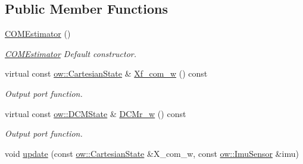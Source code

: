 \subsection*{Public Member Functions}
\begin{DoxyCompactItemize}
\item 
\hyperlink{classow__com_1_1COMEstimator_aee6f0a9c7f06cf62ef41ca7180374e52}{C\+O\+M\+Estimator} ()\hypertarget{classow__com_1_1COMEstimator_aee6f0a9c7f06cf62ef41ca7180374e52}{}\label{classow__com_1_1COMEstimator_aee6f0a9c7f06cf62ef41ca7180374e52}

\begin{DoxyCompactList}\small\item\em \hyperlink{classow__com_1_1COMEstimator}{C\+O\+M\+Estimator} Default constructor. \end{DoxyCompactList}\item 
virtual const \hyperlink{classow__core_1_1CartesianState}{ow\+::\+Cartesian\+State} \& \hyperlink{classow__com_1_1COMEstimator_af0474ec2ab3a61d06ab3dd80c70b0b2e}{Xf\+\_\+com\+\_\+w} () const 
\begin{DoxyCompactList}\small\item\em Output port function. \end{DoxyCompactList}\item 
virtual const \hyperlink{classow__core_1_1DivergentComponentOfMotionState}{ow\+::\+D\+C\+M\+State} \& \hyperlink{classow__com_1_1COMEstimator_a70d5e11ea25009c7894d64763f72f26c}{D\+C\+Mr\+\_\+w} () const 
\begin{DoxyCompactList}\small\item\em Output port function. \end{DoxyCompactList}\item 
void \hyperlink{classow__com_1_1COMEstimator_a784d8b980348a546ae69b17ec27ab1c2}{update} (const \hyperlink{classow__core_1_1CartesianState}{ow\+::\+Cartesian\+State} \&X\+\_\+com\+\_\+w, const \hyperlink{classow__core_1_1InertialMeasurmentUnitSensor}{ow\+::\+Imu\+Sensor} \&imu)
\end{DoxyCompactItemize}
